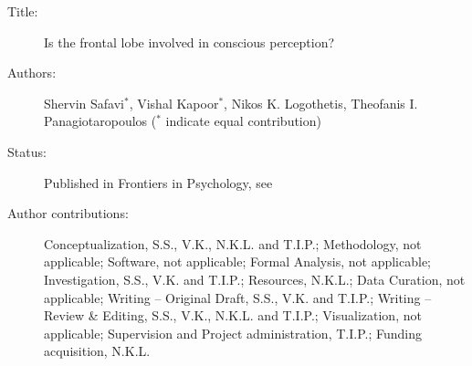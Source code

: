 \begin{description}
\item[Title:]
  Is the frontal lobe involved in conscious perception?
\item[Authors:]
  Shervin Safavi$^*$,
  Vishal Kapoor$^*$,
  Nikos K. Logothetis,
  Theofanis I. Panagiotaropoulos
  ($^*$ indicate equal contribution) 
\item[Status:]
  Published in Frontiers in Psychology, see \citet{safaviFrontalLobeInvolved2014}
\item[Author contributions: ]
  Conceptualization, S.S., V.K., N.K.L. and T.I.P.; 
  Methodology, not applicable;
  Software, not applicable;
  Formal Analysis, not applicable;
  Investigation, S.S., V.K. and T.I.P.; 
  Resources, N.K.L.;
  Data Curation, not applicable;
  Writing -- Original Draft, S.S., V.K. and T.I.P.; 
  Writing -- Review \& Editing, S.S., V.K., N.K.L. and T.I.P.; 
  Visualization, not applicable;
  Supervision and Project administration, T.I.P.;
  Funding acquisition, N.K.L.
\end{description}

